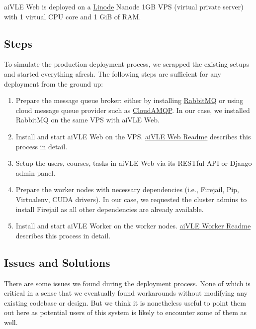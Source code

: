 \documentclass[fyp]{socreport}
\begin{document}
aiVLE Web is deployed on a \href{https://linode.com/}{Linode} Nanode 1GB VPS (virtual private server) with 1 virtual CPU core and 1 GiB of RAM.

\subsection{Steps}

To simulate the production deployment process, we scrapped the existing setups and started everything afresh. The following steps are sufficient for any deployment from the ground up:

\begin{enumerate}
    \item Prepare the message queue broker: either by installing \href{https://www.rabbitmq.com/}{RabbitMQ} or using cloud message queue provider such as \href{https://www.cloudamqp.com/}{CloudAMQP}. In our case, we installed RabbitMQ on the same VPS with aiVLE Web.
    \item Install and start aiVLE Web on the VPS.  \href{https://github.com/edu-ai/aivle-web#readme}{aiVLE Web Readme} describes this process in detail.
    \item Setup the users, courses, tasks in aiVLE Web via its RESTful API or Django admin panel.
    \item Prepare the worker nodes with necessary dependencies (i.e., Firejail, Pip, Virtualenv, CUDA drivers). In our case, we requested the cluster admins to install Firejail as all other dependencies are already available.
    \item Install and start aiVLE Worker on the worker nodes. \href{https://github.com/edu-ai/aivle-worker#readme}{aiVLE Worker Readme} describes this process in detail.
\end{enumerate}

\subsection{Issues and Solutions}
There are some issues we found during the deployment process. None of which is critical in a sense that we eventually found workarounds without modifying any existing codebase or design. But we think it is nonetheless useful to point them out here as potential users of this system is likely to encounter some of them as well.
\end{document}
